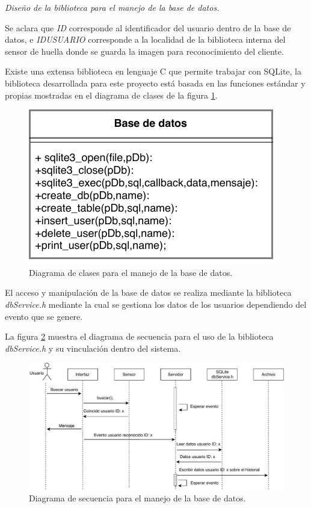\textsl{Diseño de la biblioteca para el manejo de la base de datos.}

Se aclara que \textit{ID} corresponde al identificador del usuario dentro de la base de datos, e \textit{IDUSUARIO} corresponde a la localidad de la biblioteca interna del sensor de huella donde se guarda la imagen para reconocimiento del cliente.

Existe una extensa biblioteca en lenguaje C que permite trabajar con SQLite, la biblioteca desarrollada para este proyecto está basada en las funciones estándar y propias mostradas en el diagrama de clases de la figura \ref{fig:clasesql}.

\begin{figure}[H]
	\centering
	\includegraphics[scale=1]{./Figures/clasesql.pdf}
	\caption{Diagrama de clases para el manejo de la base de datos.}
	\label{fig:clasesql}
\end{figure}


El acceso y manipulación de la base de datos se realiza mediante la biblioteca \textit{dbService.h} mediante la cual se gestiona los datos de los usuarios dependiendo del evento que se genere.

La figura \ref{fig:secuenciasql} muestra el diagrama de secuencia para el uso de la biblioteca \textit{dbService.h} y su vinculación dentro del sistema.

\begin{figure}[H]
	\centering
	\includegraphics[scale=.75]{./Figures/secuenciasql.pdf}
	\caption{Diagrama de secuencia para el manejo de la base de datos.}
	\label{fig:secuenciasql}
\end{figure}

